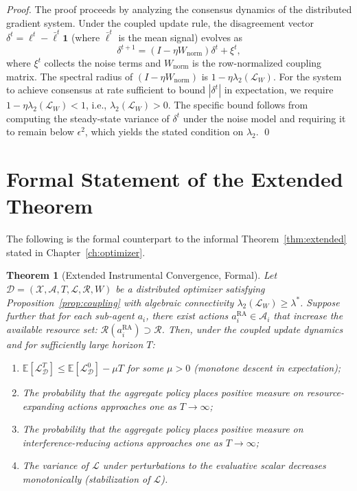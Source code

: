 \documentclass[12pt, oneside]{book}
\theoremstyle{plain}
\newtheorem{theorem}{Theorem}[chapter]
\theoremstyle{definition}
\theoremstyle{remark}
\theoremstyle{definition}
\begin{document}
\begin{proof}
The proof proceeds by analyzing the consensus dynamics of the distributed gradient
system. Under the coupled update rule, the disagreement vector
$\delta^t = \ell^t - \bar{\ell}^t \mathbf{1}$ (where $\bar{\ell}^t$ is the mean
signal) evolves as
\[
\delta^{t+1} = (I - \eta W_{\text{norm}}) \delta^t + \xi^t,
\]
where $\xi^t$ collects the noise terms and $W_{\text{norm}}$ is the row-normalized
coupling matrix. The spectral radius of $(I - \eta W_{\text{norm}})$ is
$1 - \eta \lambda_2(\mathcal{L}_W)$. For the system to achieve consensus at rate
sufficient to bound $|\delta^t|$ in expectation, we require
$1 - \eta \lambda_2(\mathcal{L}_W) < 1$, i.e., $\lambda_2(\mathcal{L}_W) > 0$.
The specific bound follows from computing the steady-state variance of $\delta^t$
under the noise model and requiring it to remain below $\epsilon^2$, which yields
the stated condition on $\lambda_2$. \qed
\end{proof}

\section{Formal Statement of the Extended Theorem}

The following is the formal counterpart to the informal Theorem~\ref{thm:extended}
stated in Chapter~\ref{ch:optimizer}.

\begin{theorem}[Extended Instrumental Convergence, Formal]
\label{thm:formal}
Let $\mathcal{D} = (\mathcal{X}, \mathcal{A}, T, \mathcal{L}, \mathcal{R}, W)$
be a distributed optimizer satisfying Proposition~\ref{prop:coupling} with
algebraic connectivity $\lambda_2(\mathcal{L}_W) \geq \lambda^*$. Suppose
further that for each sub-agent $a_i$, there exist actions
$a_i^{\mathrm{RA}} \in \mathcal{A}_i$ that increase the available resource
set: $\mathcal{R}(a_i^{\mathrm{RA}}) \supset \mathcal{R}$. Then, under the coupled
update dynamics and for sufficiently large horizon $T$:
\begin{enumerate}
\item $\mathbb{E}[\mathcal{L}_\mathcal{D}^T] \leq \mathbb{E}[\mathcal{L}_\mathcal{D}^0] - \mu T$
      for some $\mu > 0$ (monotone descent in expectation);
\item The probability that the aggregate policy places positive measure on
      resource-expanding actions approaches one as $T \to \infty$;
\item The probability that the aggregate policy places positive measure on
      interference-reducing actions approaches one as $T \to \infty$;
\item The variance of $\mathcal{L}$ under perturbations to the evaluative scalar
      decreases monotonically (stabilization of $\mathcal{L}$).
\end{enumerate}
\end{theorem}
\end{document}
